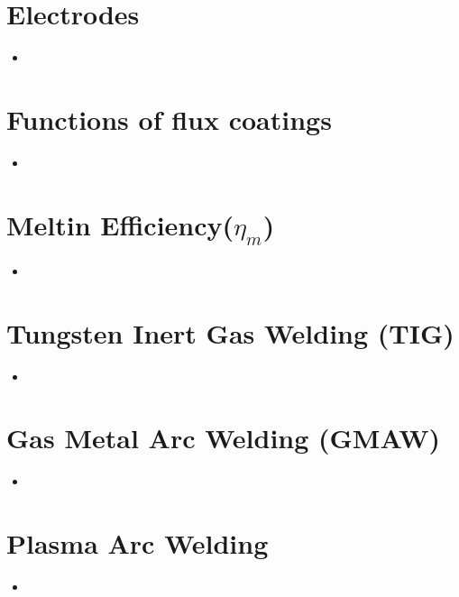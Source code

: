 \documentclass[8pt]{report}
\begin{document}
\section{Electrodes}
	\begin{itemize}
		\item
	\end{itemize}\hrulefill
\section{Functions of flux coatings}
	\begin{itemize}
		\item
	\end{itemize}\hrulefill
\section{Meltin Efficiency($\eta_m$)}
	\begin{itemize}
		\item
	\end{itemize}\hrulefill
\section{Tungsten Inert Gas Welding (TIG)}
	\begin{itemize}
		\item
	\end{itemize}\hrulefill
\section{Gas Metal Arc Welding (GMAW)}
	\begin{itemize}
		\item
	\end{itemize}\hrulefill
\section{Plasma Arc Welding}
	\begin{itemize}
		\item
	\end{itemize}\hrulefill
\end{document}

